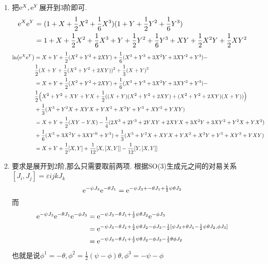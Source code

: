 \begin{solution}
    \begin{enumerate}[label=(\arabic*)]
    \item 把$\mathrm e^{X},\mathrm e^{Y}$展开到3阶即可.
    \begin{align*}
        \mathrm e^{X}\mathrm e^{Y}&=(1+X+\frac12X^2+\frac16X^3)(1+Y+\frac12Y^2+\frac16Y^3)\\&=
        1+X+\frac12X^2+\frac16X^3+Y+\frac12Y^2+\frac16Y^3+XY+\frac12X^2Y+\frac12XY^2
    \end{align*}
    \begin{align*}
        \ln(\mathrm e^{X}\mathrm e^{Y})&=X+Y+\frac12(X^2+Y^2+2XY)+\frac16(X^3+Y^3+3X^2Y+3XY^2+Y^3)-\\&\frac12(X+Y+\frac12(X^2+Y^2+2XY))^2+\frac13(X+Y)^3\\&=X+Y+\frac12(X^2+Y^2+2XY)+\frac16(X^3+Y^3+3X^2Y+3XY^2+Y^3)-\\&\frac12\Big(X^2+Y^2+XY+YX+\frac12((X+Y)(X^2+Y^2+2XY)+(X^2+Y^2+2XY)(X+Y))\Big)\\&+\frac13(X^3+Y^2X+XYX+YX^2+X^2Y+Y^3+XY^2+YXY)\\&=X+Y+\frac12(XY-YX)-\frac14(2X^3+2Y^3+2YXY+2XYX+3X^2Y+3XY^2+Y^2X+YX^2)\\&+\frac16(X^3+3X^2Y+3XY^@+Y^3)+\frac13(X^3+Y^2X+XYX+YX^2+X^2Y+Y^3+XY^2+YXY)\\&=X+Y+\frac{1}{2}[X,Y]+\frac{1}{12}[X,[X,Y]]-\frac{1}{12}[Y,[X,Y]]
    \end{align*}

    \item 要求是展开到2阶,那么只需要取前两项.
    根据SO(3)生成元之间的对易关系$[J_i,J_j]=\varepsilon{ijk}J_k$
    $$\mathrm e^{-\psi J_3}\mathrm e^{-\theta J_1}=\mathrm e^{-\psi J_3+-\theta J_1+\frac12\psi\theta J_2}$$
    而
    \begin{align*}
        \mathrm e^{-\psi J_3}\mathrm e^{-\theta J_1}\mathrm e^{-\phi J_3}&=\mathrm e^{-\psi J_3-\theta J_1+\frac12\psi\theta J_2}\mathrm e^{-\phi J_3}\\&=\mathrm e^{-\psi J_3-\theta J_1+\frac12\psi\theta J_2-\phi J_3-\frac12[\psi J_3+\theta J_1-\frac12\psi\theta J_2,\phi J_3]}\\&=\mathrm e^{-\psi J_3-\theta J_1+\frac12\psi\theta J_2-\phi J_3-\frac12\theta\phi J_2}
    \end{align*}
    也就是说$\phi^1=-\theta,\phi^2=\frac{1}{2}(\psi-\phi)\theta,\phi^3=-\psi-\phi$
    \end{enumerate}    
\end{solution}

